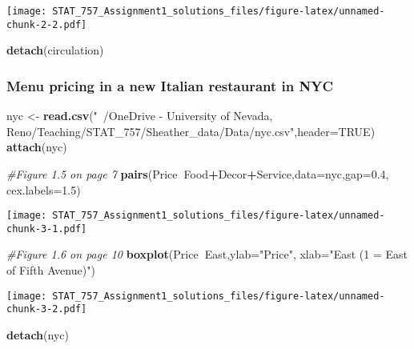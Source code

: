 \documentclass[]{article}
\newenvironment{Shaded}{\begin{snugshade}}{\end{snugshade}}
\newcommand{\CommentTok}[1]{\textcolor[rgb]{0.56,0.35,0.01}{\textit{#1}}}
\newcommand{\DataTypeTok}[1]{\textcolor[rgb]{0.13,0.29,0.53}{#1}}
\newcommand{\FloatTok}[1]{\textcolor[rgb]{0.00,0.00,0.81}{#1}}
\newcommand{\KeywordTok}[1]{\textcolor[rgb]{0.13,0.29,0.53}{\textbf{#1}}}
\newcommand{\NormalTok}[1]{#1}
\newcommand{\OperatorTok}[1]{\textcolor[rgb]{0.81,0.36,0.00}{\textbf{#1}}}
\newcommand{\OtherTok}[1]{\textcolor[rgb]{0.56,0.35,0.01}{#1}}
\newcommand{\StringTok}[1]{\textcolor[rgb]{0.31,0.60,0.02}{#1}}
\begin{document}
\texttt{[image: STAT\_757\_Assignment1\_solutions\_files/figure-latex/unnamed-chunk-2-2.pdf]}

\begin{Shaded}
\begin{Highlighting}[]
\KeywordTok{detach}\NormalTok{(circulation)}
\end{Highlighting}
\end{Shaded}

\hypertarget{menu-pricing-in-a-new-italian-restaurant-in-nyc}{%
\subsubsection{Menu pricing in a new Italian restaurant in
NYC}\label{menu-pricing-in-a-new-italian-restaurant-in-nyc}}

\begin{Shaded}
\begin{Highlighting}[]
\NormalTok{nyc <-}\StringTok{ }\KeywordTok{read.csv}\NormalTok{(}\StringTok{"~/OneDrive - University of Nevada, Reno/Teaching/STAT_757/Sheather_data/Data/nyc.csv"}\NormalTok{,}\DataTypeTok{header=}\OtherTok{TRUE}\NormalTok{)}
\KeywordTok{attach}\NormalTok{(nyc)}

\CommentTok{#Figure 1.5 on page 7}
\KeywordTok{pairs}\NormalTok{(Price}\OperatorTok{~}\NormalTok{Food}\OperatorTok{+}\NormalTok{Decor}\OperatorTok{+}\NormalTok{Service,}\DataTypeTok{data=}\NormalTok{nyc,}\DataTypeTok{gap=}\FloatTok{0.4}\NormalTok{,}
\DataTypeTok{cex.labels=}\FloatTok{1.5}\NormalTok{)}
\end{Highlighting}
\end{Shaded}

\texttt{[image: STAT\_757\_Assignment1\_solutions\_files/figure-latex/unnamed-chunk-3-1.pdf]}

\begin{Shaded}
\begin{Highlighting}[]
\CommentTok{#Figure 1.6 on page 10}
\KeywordTok{boxplot}\NormalTok{(Price}\OperatorTok{~}\NormalTok{East,}\DataTypeTok{ylab=}\StringTok{"Price"}\NormalTok{,}
\DataTypeTok{xlab=}\StringTok{"East (1 = East of Fifth Avenue)"}\NormalTok{)}
\end{Highlighting}
\end{Shaded}

\texttt{[image: STAT\_757\_Assignment1\_solutions\_files/figure-latex/unnamed-chunk-3-2.pdf]}

\begin{Shaded}
\begin{Highlighting}[]
\KeywordTok{detach}\NormalTok{(nyc)}
\end{Highlighting}
\end{Shaded}
\end{document}
